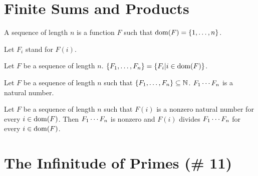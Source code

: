 \documentclass{article}
\begin{document}
\section{Finite Sums and Products}

\begin{forthel}

\begin{definition}
A sequence of length $n$ is a
function $F$ such that $\operatorname{dom}(F) = \{1,\dots,n\}$.
\end{definition}

Let $F_{i}$ stand for $F(i)$.

\begin{definition}
Let $F$ be a sequence of length $n$.
$\{F_{1},\dots,F_{n}\} = \{ F_{i} | i \in \operatorname{dom}(F)\}$.
\end{definition}





\begin{signature}
Let $F$ be a sequence of length $n$
such that $\{F_{1},\dots,F_{n}\} \subseteq \mathbb{N}$.
$F_{1} \cdots F_{n}$ is a natural number.
\end{signature}

\begin{axiom}[Factorproperty]
Let $F$ be a sequence of length $n$
such that $F(i)$ is a nonzero natural number for every $i \in \operatorname{dom}(F)$.
Then $F_{1} \cdots F_{n}$ is nonzero and
$F(i)$ divides $F_{1} \cdots F_{n}$ for every $i \in \operatorname{dom}(F)$.
\end{axiom}

\end{forthel}

\section{The Infinitude of Primes (\# 11)}
\end{document}
